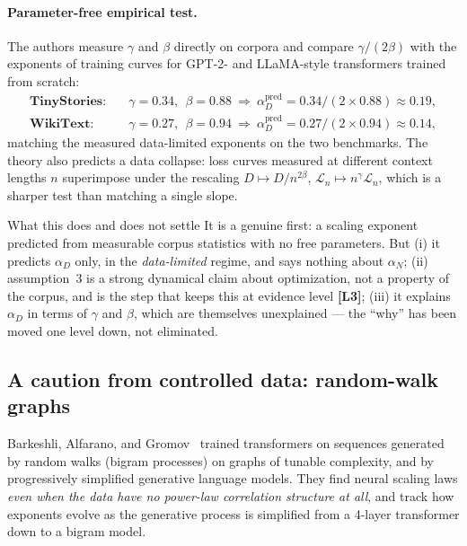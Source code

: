 \documentclass[11pt,a4paper]{article}
\theoremstyle{definition}
\begin{document}
\paragraph{Parameter-free empirical test.} The authors measure $\gamma$ and $\beta$ directly on corpora and compare $\gamma/(2\beta)$ with the exponents of training curves for GPT-2- and LLaMA-style transformers trained from scratch:
\begin{align}
  \textbf{TinyStories:}&\quad \gamma = 0.34,\ \ \beta = 0.88 \ \Longrightarrow\ \alpha_D^{\mathrm{pred}} = 0.34/(2\times 0.88) \approx 0.19, \\
  \textbf{WikiText:}&\quad \gamma = 0.27,\ \ \beta = 0.94 \ \Longrightarrow\ \alpha_D^{\mathrm{pred}} = 0.27/(2\times 0.94) \approx 0.14,
\end{align}
matching the measured data-limited exponents on the two benchmarks. The theory also predicts a data collapse: loss curves measured at different context lengths $n$ superimpose under the rescaling $D\mapsto D/n^{2\beta}$, $\mathcal{L}_n\mapsto n^{\gamma}\mathcal{L}_n$, which is a sharper test than matching a single slope.

\begin{caution}{What this does and does not settle}
It is a genuine first: a scaling exponent predicted from measurable corpus statistics with no free parameters. But (i) it predicts $\alpha_D$ only, in the \emph{data-limited} regime, and says nothing about $\alpha_N$; (ii) assumption~3 is a strong dynamical claim about optimization, not a property of the corpus, and is the step that keeps this at evidence level \textbf{[L3]}; (iii) it explains $\alpha_D$ in terms of $\gamma$ and $\beta$, which are themselves unexplained --- the ``why'' has been moved one level down, not eliminated.
\end{caution}

\subsection{A caution from controlled data: random-walk graphs}

Barkeshli, Alfarano, and Gromov~\cite{barkeshli2026origin} trained transformers on sequences generated by random walks (bigram processes) on graphs of tunable complexity, and by progressively simplified generative language models. They find neural scaling laws \emph{even when the data have no power-law correlation structure at all}, and track how exponents evolve as the generative process is simplified from a 4-layer transformer down to a bigram model.
\end{document}
